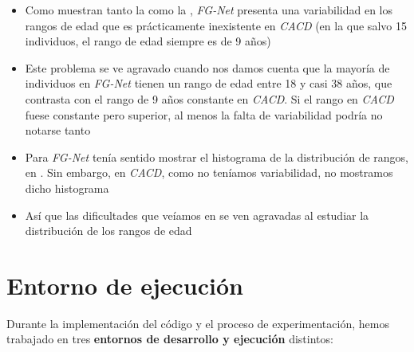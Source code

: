 \begin{itemize}
    \item Como muestran tanto la  como la , \textit{FG-Net} presenta una variabilidad en los rangos de edad que es prácticamente inexistente en \textit{CACD} (en la que salvo 15 individuos, el rango de edad siempre es de 9 años)
    \item Este problema se ve agravado cuando nos damos cuenta que la mayoría de individuos en \textit{FG-Net} tienen un rango de edad entre 18 y casi 38 años, que contrasta con el rango de 9 años constante en \textit{CACD}. Si el rango en \textit{CACD} fuese constante pero superior, al menos la falta de variabilidad podría no notarse tanto
    \item Para \textit{FG-Net} tenía sentido mostrar el histograma de la distribución de rangos, en . Sin embargo, en \textit{CACD}, como no teníamos variabilidad, no mostramos dicho histograma
    \item Así que las dificultades que veíamos en  se ven agravadas al estudiar la distribución de los rangos de edad
\end{itemize}

\section{Entorno de ejecución} \label{isec:entorno_ejecucion}

Durante la implementación del código y el proceso de experimentación, hemos trabajado en tres \textbf{entornos de desarrollo y ejecución} distintos:


